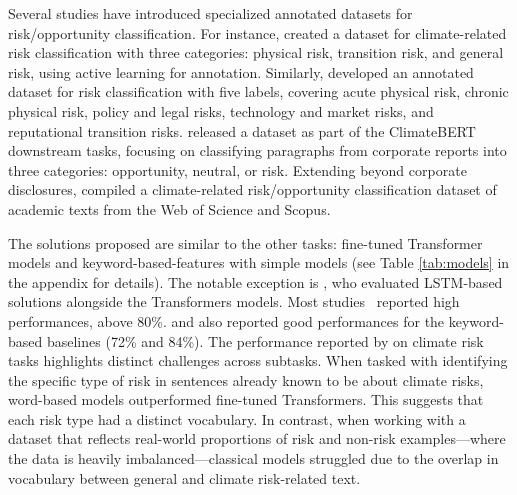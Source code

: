 \datasets Several studies have introduced specialized annotated datasets for risk/opportunity classification. For instance, \citet{kolbel_ask_2021} created a dataset for climate-related risk classification with three categories: physical risk, transition risk, and general risk, using active learning for annotation. Similarly, \citet{Friederich_climate_risk_disclosure} developed an annotated dataset for risk classification with five labels, covering acute physical risk, chronic physical risk, policy and legal risks, technology and market risks, and reputational transition risks. \citet{bingler2023cheaptalkspecificitysentiment} released a dataset as part of the ClimateBERT downstream tasks, focusing on classifying paragraphs from corporate reports into three categories: opportunity, neutral, or risk. Extending beyond corporate disclosures, \citet{xiang_dare_2023} compiled a climate-related risk/opportunity classification dataset of academic texts from the Web of Science and Scopus.

\solutions The solutions proposed are similar to the other tasks: fine-tuned Transformer models \cite{hyewon_kang_analyzing_2022, kolbel_ask_2021, Friederich_climate_risk_disclosure, bingler2023cheaptalkspecificitysentiment, nicolas_webersinke_climatebert_2021, xiang_dare_2023} and keyword-based-features with simple models \cite{kolbel_ask_2021, Friederich_climate_risk_disclosure, bingler2023cheaptalkspecificitysentiment} (see Table \ref{tab:models} in the appendix for details). The notable exception is \citet{xiang_dare_2023}, who evaluated LSTM-based solutions alongside the Transformers models. Most studies~\cite{hyewon_kang_analyzing_2022, kolbel_ask_2021, bingler2023cheaptalkspecificitysentiment, nicolas_webersinke_climatebert_2021, xiang_dare_2023} reported high performances, above 80\%. \citet{kolbel_ask_2021} and \citet{bingler2023cheaptalkspecificitysentiment} also reported good performances for the keyword-based baselines (72\% and 84\%). The performance reported by \citet{Friederich_climate_risk_disclosure} on climate risk tasks highlights distinct challenges across subtasks. When tasked with identifying the specific type of risk in sentences already known to be about climate risks, word-based models outperformed fine-tuned Transformers. This suggests that each risk type had a distinct vocabulary. In contrast, when working with a dataset that reflects real-world proportions of risk and non-risk examples—where the data is heavily imbalanced—classical models struggled due to the overlap in vocabulary between general and climate risk-related text. 

